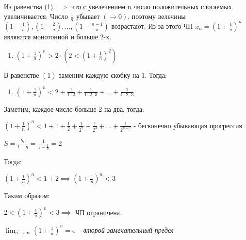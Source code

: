 \documentclass[12pt, a4paper]{article}
\theoremstyle{remark}
\begin{document}
	Из равенства (1) $\implies$ что с увелечением n число положительных слогаемых увеличивается. Число $\frac{1}{n}$ убывает $(\to 0)$, поэтому велечины $\left(1 - \frac{1}{n}\right), \left(1 - \frac{2}{n}\right), ... , \left(1 - \frac{n - 1}{n}\right)$ возрастают. Из-за этого ЧП $x_n = \left(1 + \frac{1}{n}\right)^{n}$ являются монотонной и больше 2-х.  
	
	\begin{enumerate}[label=(\arabic*), start = 2]
		\item $\left(1 + \frac{1}{n}\right)^n > 2 \cdot \left(2 < \left(1 + \frac{1}{n}\right)^2\right)$
	\end{enumerate}
	
	В равенстве $(1)$ заменим каждую скобку на 1. Тогда:
	
	\begin{enumerate}[label=(\arabic*), start = 3]
		\item $\left(1 + \frac{1}{n}\right)^n < 2 + \frac{1}{1 \cdot 2} + \frac{1}{1 \cdot 2 \cdot 3} + ... + \frac{1}{1 \cdot 2 \cdot 3}$
	\end{enumerate}
	
	Заметим, каждое число больше 2 на два, тогда:
	\vspace{0.4cm}
	
	$\left(1+ \frac{1}{n}\right)^n < 1 + 1 + \frac{1}{2} + \frac{1}{2^2} + \frac{1}{2^3} + ... + \frac{1}{2^{n-1}}$ - бесконечно убывающая прогрессия 
	\vspace{0.4cm}
	
	$S = \frac{b_1}{1 - q} = \frac{1}{1 - \frac{1}{2}} = 2$
	\vspace{0.4cm}
	
	Тогда:
	\vspace{0.4cm}
	
	$\left(1 + \frac{1}{n}\right) ^ n < 1 + 2 \implies \left(1 + \frac{1}{n}\right)^n < 3$
	\vspace{0.4cm}
	
	Таким образом:
	\vspace{0.4cm}
	
	$2 < \left(1 + \frac{1}{n}\right)^n < 3 \implies$ ЧП ограничена.
	
	\begin{tcolorbox}[colframe=red!70!black, colback=white, boxrule=1pt, arc=3pt, width=\textwidth]
		\centering
		\large
		\(\displaystyle \lim_{n \to \infty} \left(1 + \frac{1}{n}\right)^n = e\) 
		\hspace{1cm} 
		\normalsize -- \textit{второй замечательный предел}
	\end{tcolorbox}
	
\end{document}
